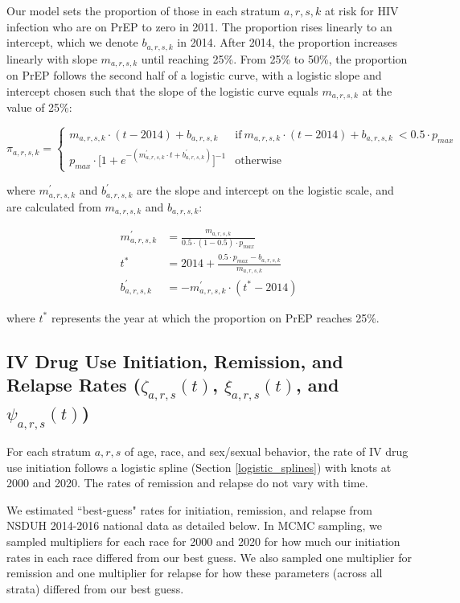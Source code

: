 \documentclass{article}
\begin{document}
Our model sets the proportion of those in each stratum $a,r,s,k$ at risk for HIV infection who are on PrEP to zero in 2011. The proportion rises linearly to an intercept, which we denote $b_{a,r,s,k}$ in 2014. After 2014, the proportion increases linearly with slope $m_{a,r,s,k}$ until reaching 25\%. From 25\% to 50\%, the proportion on PrEP follows the second half of a logistic curve, with a logistic slope and intercept chosen such that the slope of the logistic curve equals $m_{a,r,s,k}$ at the value of 25\%:

\begin{equation}
\pi_{a,r,s,k} = \begin{cases}
m_{a,r,s,k} \cdot (t-2014) + b_{a,r,s,k} & \text{if}\ m_{a,r,s,k} \cdot (t-2014) + b_{a,r,s,k}\ < 0.5 \cdot p_{max} \\
p_{max} \cdot \Big[1 + e^{-(m^\prime_{a,r,s,k} \cdot t + b^\prime_{a,r,s,k})}\Big]^{-1} & \text{otherwise}
\end{cases}
\end{equation}

where $m^\prime_{a,r,s,k}$ and $b^\prime_{a,r,s,k}$ are the slope and intercept on the logistic scale, and are calculated from $m_{a,r,s,k}$ and $b_{a,r,s,k}$:

\begin{align}
m^\prime_{a,r,s,k} &= \frac{m_{a,r,s,k}}{0.5 \cdot (1-0.5) \cdot p_{max}} \\
t^* &= 2014 + \frac{0.5 \cdot p_{max} - b_{a,r,s,k}}{m_{a,r,s,k}} \\
b^\prime_{a,r,s,k} &= -m^\prime_{a,r,s,k} \cdot (t^* - 2014)
\end{align}

where $t^*$ represents the year at which the proportion on PrEP reaches 25\%.

\subsection{IV Drug Use Initiation, Remission, and Relapse Rates \big($\zeta_{a,r,s}(t)$, $\xi_{a,r,s}(t)$, and $\psi_{a,r,s}(t)$\big)}\label{idu}

For each stratum $a,r,s$ of age, race, and sex/sexual behavior, the rate of IV drug use initiation follows a logistic spline (Section \ref{logistic_splines}) with knots at 2000 and 2020. The rates of remission and relapse do not vary with time.

We estimated ``best-guess" rates for initiation, remission, and relapse from NSDUH 2014-2016 national data\cite{nsduh} as detailed below. In MCMC sampling, we sampled multipliers for each race for 2000 and 2020 for how much our initiation rates in each race differed from our best guess. We also sampled one multiplier for remission and one multiplier for relapse for how these parameters (across all strata) differed from our best guess.
\end{document}
